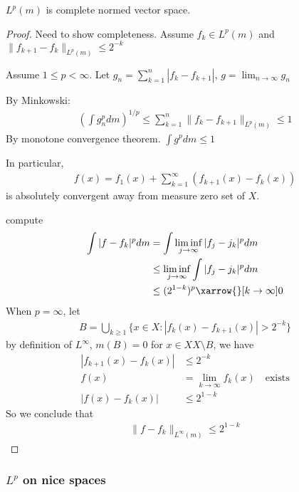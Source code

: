  \begin{theorem}
 	$L^{p}(m)$ is complete normed vector space.
 \end{theorem}
 
 \begin{proof}
 	Need to show completeness.
Assume $f_{k} \in L^{p} (m)$ and 
$\| f_{k + 1} - f_{k} \|_{L^{p} (m)} \leq 2^{-k}$

Assume $1 \leq p < \infty$. Let  $g_{n} = \sum_{k=1}^{n} | f_{k}- f_{k+1} |$, $g = \lim_{n \to \infty} g_{n}$

By Minkowski:
\begin{align*}
	\left( \int g_{n}^{p} dm \right)^{1/p} \leq \sum_{k=1}^{n} \|f_{k} - f_{k+1} \|_{L^{p}(m)} \leq 1
\end{align*} By monotone convergence theorem. $\int g^p dm \leq 1$ 

In particular,
\begin{align*}
	f(x) = f_{1} (x) + \sum_{k=1}^{\infty} (f_{k+1}(x) - f_{k}(x))
\end{align*} is absolutely convergent away from measure zero set of $X$.

compute
\begin{align*}
	\int | f - f_{k} |^{p} dm &= \int \liminf_{j \to \infty} |f_{j} - j_{k} |^{p} dm \\
							  &\leq \liminf_{j \to \infty}\int  |f_{j} - j_{k} |^{p} dm \\
							  &\leq (2^{1-k})^{p} \xarrow{}[k \to \infty] 0
\end{align*} 
When $p = \infty$, let
\begin{align*}
	B = \bigcup_{k \geq 1} \{x \in X : |f_{k} (x) - f_{k +1} (x) | > 2^{-k}\}
\end{align*} by definition of $L^{\infty}$, $m(B) = 0$ for  $x \in XX \setminus B$, we have
\begin{align*}
	|f_{k +1} (x) - f_{k} (x)| &\leq 2^{-k} \\
	f(x) &=\lim_{k \to \infty} f_{k}(x) \quad \text{exists} \\
	|f (x) - f_{k} (x) | &\leq 2^{1-k}
\end{align*} So we conclude that
\begin{align*}
	\| f - f_{k} \|_{L^{\infty} (m)} \leq 2^{1 - k}
\end{align*} 
 \end{proof}
 
\subsubsection{$L^{p}$ on nice spaces}

